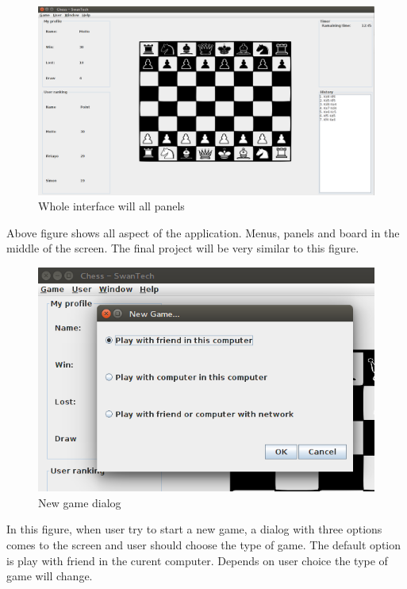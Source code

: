 \documentclass[a4paper,10pt]{article}
\begin{document}
\begin{figure}[h]
  \centering
	\includegraphics[width=\textwidth]{WholeApp.png}
  \caption{Whole interface will all panels}
  \label{fig:wholeapp}
\end{figure}
Above figure shows all aspect of the application. Menus, panels and board in the middle of the screen. The final project will be very similar to this figure.
\clearpage
\pagebreak
\begin{figure}
  \centering
	\includegraphics[width=\textwidth]{NewGame.png}
  \caption{New game dialog  \label{fig:newgamedialog}}
\end{figure}
In this figure, when user try to start a new game, a dialog with three options comes to the screen and user should choose the type of game. The default option is play with friend in the curent computer. Depends on user choice the type of game will change.  
\clearpage
\pagebreak
\end{document}
